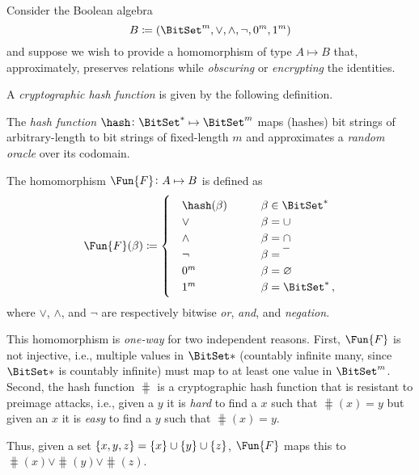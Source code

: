 \documentclass[ ../main.tex]{subfiles}
\begin{document}
Consider the Boolean algebra
\begin{equation}
	B \coloneqq \left(\BitSet^m, \lor, \land, \neg, 0^m, 1^m\right)
\end{equation}
and suppose we wish to provide a homomorphism of type $A \mapsto B$ that, approximately, preserves relations while \emph{obscuring} or \emph{encrypting} the identities.

A \emph{cryptographic hash function} is given by the following definition.
\begin{definition}
	The \emph{hash function} $\hash \colon {\BitSet^*} \mapsto \BitSet^m$ maps (hashes) bit
	strings of arbitrary-length to bit strings of fixed-length $m$ and approximates
	a \emph{random oracle} over its codomain.
\end{definition}

\begin{definition}
The homomorphism $\Fun{F} \colon A \mapsto B$ is defined as
\begin{equation}
\Fun{F}(\beta) \coloneqq
\begin{cases} 
	\quad \hash(\beta) 		& \qquad \beta \in {\BitSet^*}\\
	\quad \lor 			& \qquad \beta = \SetUnion \\
	\quad \land 		& \qquad \beta = \SetIntersection\\
	\quad \neg			& \qquad \beta = \SetComplement\\
	\quad 0^m			& \qquad \beta = \EmptySet\\
	\quad 1^m			& \qquad \beta = {\BitSet^*}\,,
\end{cases}
\end{equation}
where $\lor$, $\land$, and $\neg$ are respectively bitwise \emph{or}, \emph{and}, and \emph{negation}.
\end{definition}

This homomorphism is \emph{one-way} for two independent reasons.
First, $\Fun{F}$ is not injective, i.e., multiple values in $\BitSet*$ (countably infinite many, since $\BitSet*$ is countably infinite) must map to at least one value in $\BitSet^m$.
Second, the hash function $\hash$ is a cryptographic hash function that is resistant to preimage attacks, i.e., given a $y$ it is \emph{hard} to find a $x$ such that $\hash(x) = y$ but given an $x$ it is \emph{easy} to find a $y$ such that $\hash(x) = y$.

Thus, given a set $\{x,y,z\} = \{x\} \SetUnion \{y\} \SetUnion \{z\}$, $\Fun{F}$ maps this to $\hash(x) \lor \hash(y) \lor \hash(z)$.
\end{document}
